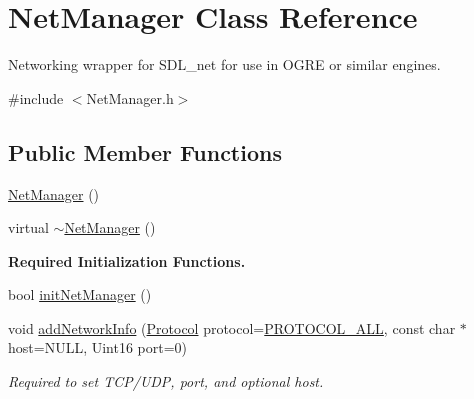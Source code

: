 \hypertarget{classNetManager}{\section{Net\-Manager Class Reference}
\label{classNetManager}
}


Networking wrapper for S\-D\-L\-\_\-net for use in O\-G\-R\-E or similar engines.  




{\ttfamily \#include $<$Net\-Manager.\-h$>$}

\subsection*{Public Member Functions}
\begin{DoxyCompactItemize}
\item 
\hyperlink{classNetManager_ac5af765a0303c73966c2e0743458f888}{Net\-Manager} ()
\item 
virtual \hyperlink{classNetManager_a862eebc070ee07d7a9e18f62da051604}{$\sim$\-Net\-Manager} ()
\end{DoxyCompactItemize}
\begin{Indent}{\bf Required Initialization Functions.}\par
\begin{DoxyCompactItemize}
\item 
bool \hyperlink{classNetManager_a9dcef281247169fc624d771f2a4ae01a}{init\-Net\-Manager} ()
\item 
void \hyperlink{classNetManager_af1228963af244b0fc75d6de780da719e}{add\-Network\-Info} (\hyperlink{NetManager_8h_a9af285d1232beed01f31aac5d3a5469f}{Protocol} protocol=\hyperlink{NetManager_8h_a06fc87d81c62e9abb8790b6e5713c55ba78c8c360e9d58fb53829c58ac0ae6a43}{P\-R\-O\-T\-O\-C\-O\-L\-\_\-\-A\-L\-L}, const char $\ast$host=N\-U\-L\-L, Uint16 port=0)
\begin{DoxyCompactList}\small\item\em Required to set T\-C\-P/\-U\-D\-P, port, and optional host. \end{DoxyCompactList}\end{DoxyCompactItemize}
\end{Indent}

